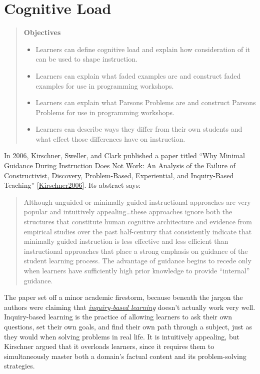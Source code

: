 \documentclass[10pt,statementpaper]{memoir}
\providecommand{\tightlist}{%
  \setlength{\itemsep}{0pt}\setlength{\parskip}{0pt}}
\begin{document}
\chapter{Cognitive Load}\label{cognitive-load}

\begin{quote}
\textbf{Objectives}

\begin{itemize}
\tightlist
\item
  Learners can define cognitive load and explain how consideration of it
  can be used to shape instruction.
\item
  Learners can explain what faded examples are and construct faded
  examples for use in programming workshops.
\item
  Learners can explain what Parsons Problems are and construct Parsons
  Problems for use in programming workshops.
\item
  Learners can describe ways they differ from their own students and
  what effect those differences have on instruction.
\end{itemize}
\end{quote}

In 2006, Kirschner, Sweller, and Clark published a paper titled ``Why
Minimal Guidance During Instruction Does Not Work: An Analysis of the
Failure of Constructivist, Discovery, Problem-Based, Experiential, and
Inquiry-Based Teaching''
{[}\href{biblio.html\#kirschner-minimal}{Kirschner2006}{]}. Its abstract
says:

\begin{quote}
Although unguided or minimally guided instructional approaches are very
popular and intuitively appealing\ldots{}these approaches ignore both
the structures that constitute human cognitive architecture and evidence
from empirical studies over the past half-century that consistently
indicate that minimally guided instruction is less effective and less
efficient than instructional approaches that place a strong emphasis on
guidance of the student learning process. The advantage of guidance
begins to recede only when learners have sufficiently high prior
knowledge to provide ``internal'' guidance.
\end{quote}

The paper set off a minor academic firestorm, because beneath the jargon
the authors were claiming that
\emph{\href{gloss.html\#inquiry-based-learning}{inquiry-based learning}}
doesn't actually work very well. Inquiry-based learning is the practice
of allowing learners to ask their own questions, set their own goals,
and find their own path through a subject, just as they would when
solving problems in real life. It is intuitively appealing, but
Kirschner argued that it overloads learners, since it requires them to
simultaneously master both a domain's factual content and its
problem-solving strategies.
\end{document}
